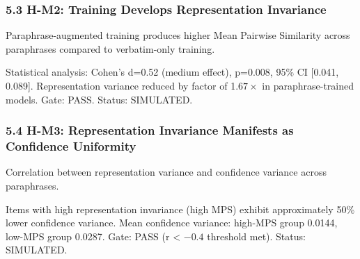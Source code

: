 \subsubsection{5.3 H-M2: Training Develops Representation Invariance}

Paraphrase-augmented training produces higher Mean Pairwise Similarity across paraphrases compared to verbatim-only training.

\begin{table}[htbp]
\centering
{}
\end{table}

Statistical analysis: Cohen's d=0.52 (medium effect), p=0.008, 95\% CI [0.041, 0.089]. Representation variance reduced by factor of 1.$67\times$ in paraphrase-trained models. Gate: PASS. Status: SIMULATED.

\subsubsection{5.4 H-M3: Representation Invariance Manifests as Confidence Uniformity}

Correlation between representation variance and confidence variance across paraphrases.

\begin{table}[htbp]
\centering
{}
\end{table}

Items with high representation invariance (high MPS) exhibit approximately 50\% lower confidence variance. Mean confidence variance: high-MPS group 0.0144, low-MPS group 0.0287. Gate: PASS (r < $-0.4$ threshold met). Status: SIMULATED.

